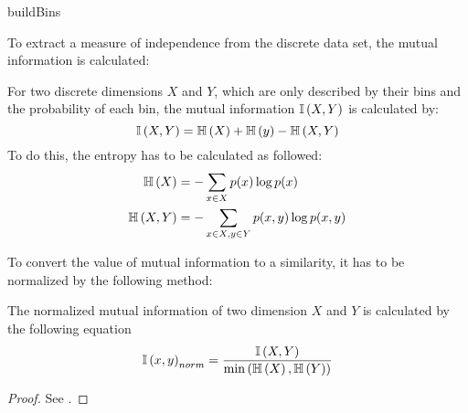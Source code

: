 \begin{algorithm}



	\caption{buildBins}
	\label{alg:buildBins}
\end{algorithm}

To extract a measure of independence from the discrete data set, the mutual information is calculated:

\begin{envdef}
	For two discrete dimensions $X$ and $Y$, which are only described by their bins and the probability of each bin, the mutual information $\mathbb{I}\left(X,Y\right)$ is calculated by:
	\begin{equation}
		\mathbb{I}\left(X,Y\right) = \mathbb{H}\left(X\right) + \mathbb{H}\left(y\right) - \mathbb{H}\left(X,Y\right)
	\end{equation}
	To do this, the entropy has to be calculated as followed:
	\begin{align}
		\mathbb{H}\left(X\right) &= - \sum_{x \in X} p(x) \log{p(x)}\\
		\mathbb{H}\left(X,Y\right) &= - \sum_{x \in X, y \in Y} p(x,y) \log{p(x,y)}
	\end{align}
\end{envdef}

To convert the value of mutual information to a similarity, it has to be normalized by the following method:

\begin{envtheo}
	The normalized mutual information of two dimension $X$ and $Y$ is calculated by the following equation
	\begin{equation}
		\mathbb{I}\left(x,y\right)_{norm} = \frac{\mathbb{I}\left(X,Y\right)}{\min{\left( \mathbb{H}\left(X\right), \mathbb{H}\left(Y\right) \right)}}
	\end{equation}
\end{envtheo}
\begin{proof}
	See \cite{mutual}.
\end{proof}

